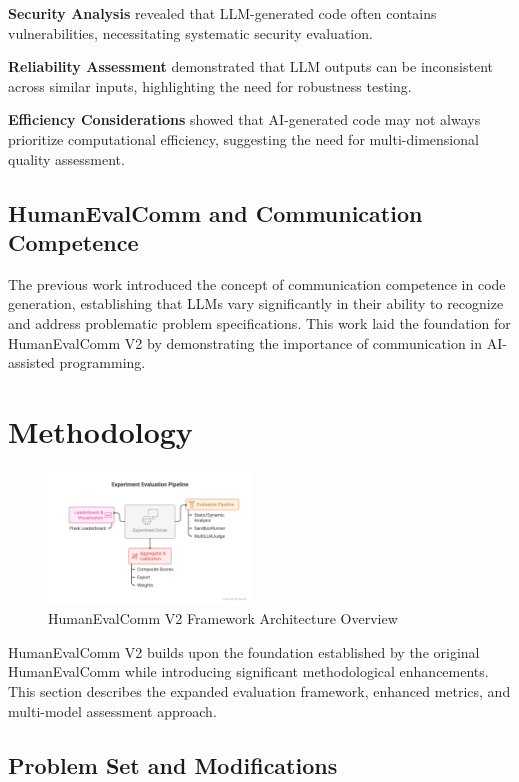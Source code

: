 \documentclass[conference]{IEEEtran}
\begin{document}
\textbf{Security Analysis} \cite{pearce2022asleep} revealed that LLM-generated code often contains vulnerabilities, necessitating systematic security evaluation.

\textbf{Reliability Assessment} \cite{chen2021evaluating} demonstrated that LLM outputs can be inconsistent across similar inputs, highlighting the need for robustness testing.

\textbf{Efficiency Considerations} \cite{nijkamp2022codegen} showed that AI-generated code may not always prioritize computational efficiency, suggesting the need for multi-dimensional quality assessment.

\subsection{HumanEvalComm and Communication Competence}

The previous work \cite{wu2025humanevalcomm} introduced the concept of communication competence in code generation, establishing that LLMs vary significantly in their ability to recognize and address problematic problem specifications. This work laid the foundation for HumanEvalComm V2 by demonstrating the importance of communication in AI-assisted programming.

\section{Methodology}
\begin{figure}[ht]
    \centering
    \includegraphics[width=0.48\textwidth]{../architecture.png}
    \caption{HumanEvalComm V2 Framework Architecture Overview}
    \label{fig:architecture-overview}
\end{figure}

HumanEvalComm V2 builds upon the foundation established by the original HumanEvalComm while introducing significant methodological enhancements. This section describes the expanded evaluation framework, enhanced metrics, and multi-model assessment approach.

\subsection{Problem Set and Modifications}
\end{document}
